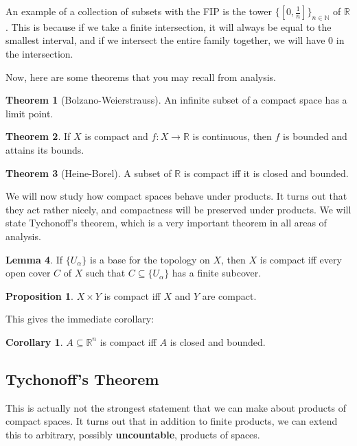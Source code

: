 \documentclass[11pt, oneside]{amsart}   	%
\theoremstyle{definition}
\newtheorem{theorem}{Theorem}[section]
\newtheorem{corollary}{Corollary}[theorem]
\newtheorem{lemma}[theorem]{Lemma}
\newtheorem{prop}{Proposition}[section]
\begin{document}
	An example of a collection of subsets with the FIP is the tower $\{[0, \frac{1}{n}]\}_{n\in\mathbb N}$ of $\mathbb R$. 
	This is because if we take a finite intersection, it will always be equal to the smallest interval, and if we intersect the 
	entire family together, we will have $0$ in the intersection. 
		
	Now, here are some theorems that you may recall from analysis.
	
	\begin{theorem}[Bolzano-Weierstrauss]
		An infinite subset of a compact space has a limit point.
	\end{theorem}
	
	\begin{theorem}
		If $X$ is compact and $f : X\rightarrow\mathbb R$ is continuous, then $f$ is bounded and attains its bounds.
	\end{theorem}
	
	\begin{theorem}[Heine-Borel]
		A subset of $\mathbb R$ is compact iff it is closed and bounded.
	\end{theorem}
	
	We will now study how compact spaces behave under products. It turns out that they act rather nicely, and 
	compactness will be preserved under products. We will state Tychonoff's theorem, which is a very important 
	theorem in all areas of analysis.
	
	\begin{lemma}
		If $\{U_\alpha\}$ is a base for the topology on $X$, then $X$ is compact iff every open cover $C$ of $X$ such that 
		$C\subseteq\{U_\alpha\}$ has a 
		finite subcover.
	\end{lemma}
	
	\begin{prop}
		$X\times Y$ is compact iff $X$ and $Y$ are compact.
	\end{prop}
	
	This gives the immediate corollary:
	
	\begin{corollary}
		$A\subseteq\mathbb R^n$ is compact iff $A$ is closed and bounded.
	\end{corollary}
	
	\subsection{Tychonoff's Theorem}
	
	This is actually not the strongest statement that we can make about products of compact spaces. It turns out that in 
	addition to finite products, we can extend this to arbitrary, possibly \textbf{uncountable}, products of spaces.
	
\end{document}
